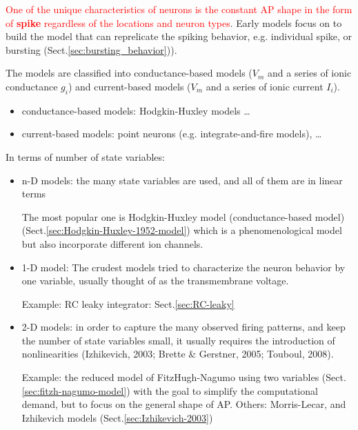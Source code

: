 \textcolor{red}{One of the unique characteristics of neurons is the constant AP
shape in the form of {\bf spike} regardless of the locations and neuron types}.
Early models focus on to build the model that can reprelicate the spiking
behavior, e.g.
individual spike, or bursting (Sect.\ref{sec:bursting_behavior})).

The models are classified into conductance-based models ($V_m$ and a series
of ionic conductance $g_i$) and current-based models ($V_m$ and a series of
ionic current $I_i$). 
\begin{itemize}
  \item conductance-based models: Hodgkin-Huxley models \ldots
  
  \item current-based models: point neurons (e.g. integrate-and-fire models),
  \ldots
\end{itemize}

In terms of number of state variables:
\begin{itemize}
  \item n-D models: the many state variables are used, and all of them are in
  linear terms
  
  The most popular one is Hodgkin-Huxley model (conductance-based model)
  (Sect.\ref{sec:Hodgkin-Huxley-1952-model}) which is a phenomenological model but
  also incorporate different ion channels. 

  \item 1-D model:
The crudest models tried to characterize the neuron behavior by one variable,
usually thought of as the transmembrane voltage.

Example: RC leaky integrator: Sect.\ref{sec:RC-leaky}
  
  \item 2-D models: in order to capture the many observed firing patterns, and
  keep the number of state variables small, it usually requires the introduction
  of nonlinearities (Izhikevich, 2003; Brette \& Gerstner, 2005; Touboul, 2008).

Example: the reduced model of FitzHugh-Nagumo using two
variables (Sect.\ref{sec:fitzh-nagumo-model}) with the goal to simplify the
computational demand, but to focus on the general shape of AP.
Others: Morris-Lecar, and Izhikevich models (Sect.\ref{sec:Izhikevich-2003})
  

\end{itemize}

